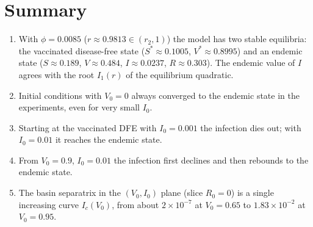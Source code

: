 \documentclass[11pt]{article}
\begin{document}
\section{Summary}

\begin{enumerate}
\item With $\phi=0.0085$ ($r\approx0.9813\in(r_2,1)$) the model has two stable equilibria: the vaccinated disease-free state ($S^*\approx0.1005$, $V^*\approx0.8995$) and an endemic state ($S\approx0.189$, $V\approx0.484$, $I\approx0.0237$, $R\approx0.303$). The endemic value of $I$ agrees with the root $I_1(r)$ of the equilibrium quadratic.
\item Initial conditions with $V_0=0$ always converged to the endemic state in the experiments, even for very small $I_0$.
\item Starting at the vaccinated DFE with $I_0=0.001$ the infection dies out; with $I_0=0.01$ it reaches the endemic state.
\item From $V_0=0.9$, $I_0=0.01$ the infection first declines and then rebounds to the endemic state.
\item The basin separatrix in the $(V_0,I_0)$ plane (slice $R_0=0$) is a single increasing curve $I_c(V_0)$, from about $2\times10^{-7}$ at $V_0=0.65$ to $1.83\times10^{-2}$ at $V_0=0.95$.
\end{enumerate}
\end{document}
